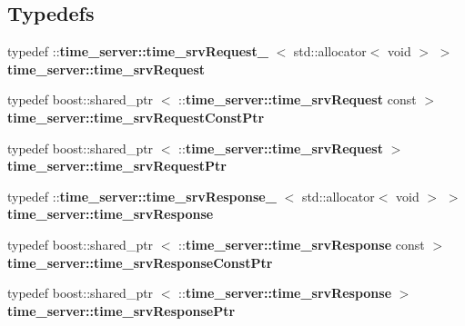 \subsection*{\-Typedefs}
\begin{DoxyCompactItemize}
\item 
typedef \*
\-::{\bf time\-\_\-server\-::time\-\_\-srv\-Request\-\_\-}\*
$<$ std\-::allocator$<$ void $>$ $>$ {\bf time\-\_\-server\-::time\-\_\-srv\-Request}
\item 
typedef boost\-::shared\-\_\-ptr\*
$<$ \-::{\bf time\-\_\-server\-::time\-\_\-srv\-Request} \*
const  $>$ {\bf time\-\_\-server\-::time\-\_\-srv\-Request\-Const\-Ptr}
\item 
typedef boost\-::shared\-\_\-ptr\*
$<$ \-::{\bf time\-\_\-server\-::time\-\_\-srv\-Request} $>$ {\bf time\-\_\-server\-::time\-\_\-srv\-Request\-Ptr}
\item 
typedef \*
\-::{\bf time\-\_\-server\-::time\-\_\-srv\-Response\-\_\-}\*
$<$ std\-::allocator$<$ void $>$ $>$ {\bf time\-\_\-server\-::time\-\_\-srv\-Response}
\item 
typedef boost\-::shared\-\_\-ptr\*
$<$ \-::{\bf time\-\_\-server\-::time\-\_\-srv\-Response} \*
const  $>$ {\bf time\-\_\-server\-::time\-\_\-srv\-Response\-Const\-Ptr}
\item 
typedef boost\-::shared\-\_\-ptr\*
$<$ \-::{\bf time\-\_\-server\-::time\-\_\-srv\-Response} $>$ {\bf time\-\_\-server\-::time\-\_\-srv\-Response\-Ptr}
\end{DoxyCompactItemize}
